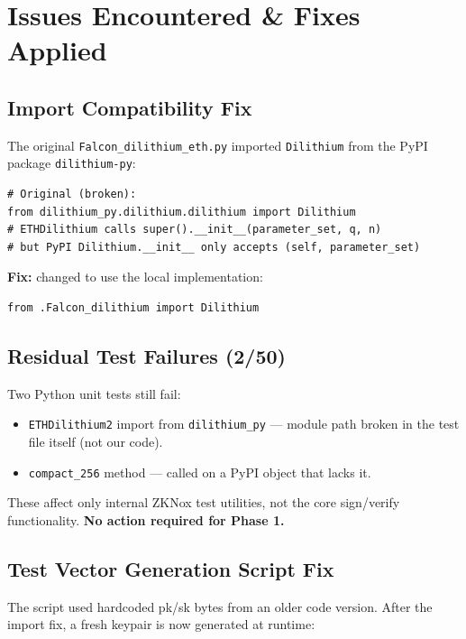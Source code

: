 \documentclass[11pt,a4paper]{article}
\begin{document}
\section{Issues Encountered \& Fixes Applied}

\subsection{Import Compatibility Fix}

The original \texttt{Falcon\_dilithium\_eth.py} imported \texttt{Dilithium} from the PyPI package \texttt{dilithium-py}:

\begin{lstlisting}[style=python, caption={Original import — caused TypeError}]
# Original (broken):
from dilithium_py.dilithium.dilithium import Dilithium
# ETHDilithium calls super().__init__(parameter_set, q, n)
# but PyPI Dilithium.__init__ only accepts (self, parameter_set)
\end{lstlisting}

\textbf{Fix:} changed to use the local implementation:
\begin{lstlisting}[style=python, caption={Fixed import}]
from .Falcon_dilithium import Dilithium
\end{lstlisting}

\subsection{Residual Test Failures (2/50)}

Two Python unit tests still fail:
\begin{itemize}
  \item \texttt{ETHDilithium2} import from \texttt{dilithium\_py} — module path broken in the test file itself (not our code).
  \item \texttt{compact\_256} method — called on a PyPI object that lacks it.
\end{itemize}
These affect only internal ZKNox test utilities, not the core sign/verify functionality. \textbf{No action required for Phase 1.}

\subsection{Test Vector Generation Script Fix}

The script used hardcoded pk/sk bytes from an older code version. After the import fix, a fresh keypair is now generated at runtime:
\end{document}
